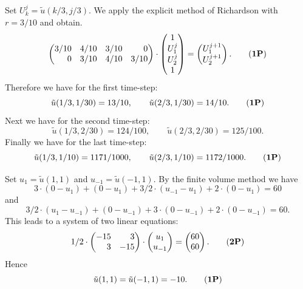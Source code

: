 \begin{loesung}
\begin{teilaufgaben}
\item
Set $U_k^{j} = \tilde u(k/3,j/3)$.
We apply the explicit method of Richardson with $r = 3/10$ and obtain. 
\begin{equation}
\begin{pmatrix*}[r]
3/10 & 4/10 & 3/10 & 0 \\
 0 & 3/10 & 4/10 & 3/10
\end{pmatrix*}
\cdot
\begin{pmatrix}1 \\  U_1^{j} \\   U_2^{j} \\  1 \end{pmatrix}
=
\begin{pmatrix} U_1^{j+1} \\  U_2^{j+1}  \end{pmatrix}.
\tag{{\bf 1P}}
\end{equation}
Therefore we have for the first time-step:
\begin{equation}
\tilde u(1/3,1/30) = 13/10, \qquad  \tilde u(2/3, 1/30) = 14/10.
\tag{{\bf 1P}}
\end{equation}
Next we have for the second time-step:
\[
\tilde u(1/3,2/30)
=
124/100,
\qquad \tilde u(2/3, 2/30)
=
125/100.
\]
Finally we have for the last time-step:
\begin{equation}
\tilde u(1/3,1/10) = 1171/1000, \qquad \tilde u(2/3, 1/10) = 1172/1000.
\tag{{\bf 1P}}
\end{equation}
\item
Set $u_1 = \tilde u(1,1)$ and $u_{-1} = \tilde u(-1,1)$.
By the finite volume method we have
\[
3 \cdot (0 - u_1) +  (0 - u_1) + 3/2 \cdot (u_{-1} - u_1)  + 2 \cdot (0 - u_1)
=
60
\]
and
\[
3/2 \cdot (u_1 - u_{-1}) +  (0 - u_{-1}) + 3 \cdot (0 - u_{-1})  + 2 \cdot (0 - u_{-1})
=
60.
\]
This leads to a system of two linear equations:
\begin{equation}
1/2 \cdot \begin{pmatrix*}[r] -15 & 3 \\  3 & -15 \end{pmatrix*}
\cdot
\begin{pmatrix} u_1  \\   u_{-1} \end{pmatrix}
=
\begin{pmatrix*}[r] 60 \\  60 \end{pmatrix*}.
\tag{{\bf 2P}}
\end{equation}
Hence
\begin{equation}
\tilde u(1,1) = \tilde u(-1,1) = -10.
\tag{{\bf 1P}}
\end{equation}
\end{teilaufgaben}
\end{loesung}
